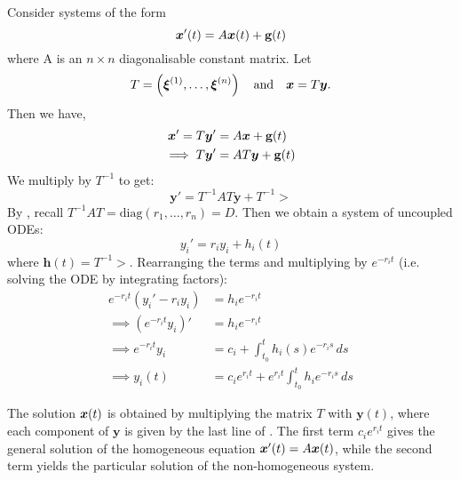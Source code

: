 Consider systems of the form
\begin{equation}
	\bm{x}'(t) = A \bm{x}(t) + \textbf{g}(t)
\end{equation} 
where A is an $n \times n$ diagonalisable constant matrix. Let
\[
T = \left(\bm{\xi} ^{(1)}, \ldots, \bm{\xi} ^{(n)}\right) \quad \text{and} \quad \bm{x} = T \bm{y}.
\]
Then we have,
\begin{align*}
	\bm{x}' = T \bm{y}' &= A \bm{x} + \textbf{g}(t) \\
	\implies T \bm{y}' &= A T \bm{y} + \textbf{g}(t)
\end{align*}
We multiply by $T^{-1}$ to get:
\begin{equation}\label{eq:diagdecoupled}
	\bm{y}' = T^{-1} A T \bm{y} + T^{-1} \gt
\end{equation}
By , recall $T^{-1} A T = \text{diag}(r_1,\ldots,r_n) = D$. Then we obtain a system of uncoupled ODEs:
\[
{y_i}' = r_i y_i + h_i(t)
\]
where $\bm{h}(t) = T^{-1} \gt$. Rearranging the terms and multiplying by $e^{-r_i t}$ (i.e. solving the ODE by integrating factors):
\begin{equation}\label{eq:diagsol}
	\begin{alignedat}{1}
		e^{-r_i t}(y_i' - r_i y_i) &= h_i e^{-r_i t} \\
		\implies (e^{-r_i t} y_i)' &= h_i e^{-r_i t} \\
		\implies e^{-r_i t} y_i &= c_i + \int^t_{t_0} h_i(s) e^{-r_i s} \,ds \\
		\implies y_i(t) &= c_i e^{r_i t} + e^{r_i t} \int^t_{t_0} h_i e^{-r_i s} \,ds
	\end{alignedat} 
\end{equation}

The solution $\bm{x}(t)$ is obtained by multiplying the matrix $T$ with $\bm{y}(t)$, where each component of $\bm{y}$ is given by the last line of . The first term $c_i e^{r_i t}$ gives the general solution of the homogeneous equation $\bm{x}'(t) = A\bm{x}(t)$, while the second term yields the particular solution of the non-homogeneous system.

